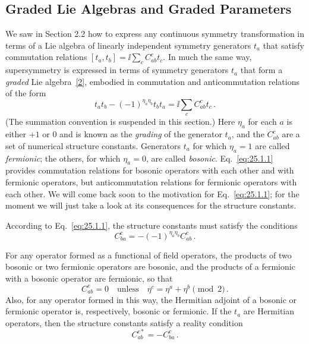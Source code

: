 
\subsection{Graded Lie Algebras and Graded Parameters}

\providecommand{\gradedbracket}[2]{\mathopen{[}#1,#2\mathclose{\}}}

We saw in Section 2.2 how to express any continuous symmetry transformation in
terms of a Lie algebra of linearly independent symmetry generators $t_a$ that
satisfy commutation relations
$[t_a,t_b]=\ii\sum_c C^c_{ab}t_c$. In much the same way, supersymmetry is
expressed in terms of symmetry generators $t_a$ that form a \emph{graded} Lie
algebra~\hyperref[ch25-ref-2]{[2]}, embodied in commutation and
anticommutation relations of the form
\begin{equation}
  t_at_b-(-1)^{\eta_a\eta_b}t_bt_a
  =\ii\sum_c C^c_{ab}t_c\,.
  \tag{25.1.1}\label{eq:25.1.1}
\end{equation}
(The summation convention is suspended in this section.) Here $\eta_a$ for
each $a$ is either $+1$ or 0 and is known as the \emph{grading} of the
generator $t_a$, and the $C^c_{ab}$ are a set of numerical structure
constants. Generators $t_a$ for which $\eta_a=1$ are called \emph{fermionic};
the others, for which $\eta_a=0$, are called \emph{bosonic}.
Eq.~\eqref{eq:25.1.1} provides commutation relations for bosonic operators with
each other and with fermionic operators, but anticommutation relations for
fermionic operators with each other. We will come back soon to the motivation
for Eq.~\eqref{eq:25.1.1}; for the moment we will just take a look at its
consequences for the structure constants.

According to Eq.~\eqref{eq:25.1.1}, the structure constants must satisfy the
conditions
\begin{equation}
  C^c_{ba}=-(-1)^{\eta_a\eta_b}C^c_{ab}\,.
  \tag{25.1.2}\label{eq:25.1.2}
\end{equation}

For any operator formed as a functional of field operators, the products of
two bosonic or two fermionic operators are bosonic, and the products of a
fermionic with a bosonic operator are fermionic, so that
\begin{equation}
  C^c_{ab}=0\quad\text{unless}\quad
  \eta^c=\eta^a+\eta^b\pmod 2\,.
  \tag{25.1.3}\label{eq:25.1.3}
\end{equation}
Also, for any operator formed in this way, the Hermitian adjoint of a bosonic
or fermionic operator is, respectively, bosonic or fermionic. If the $t_a$ are
Hermitian operators, then the structure constants satisfy a reality condition
\begin{equation}
  C^{c*}_{ab}=-C^c_{ba}\,.
  \tag{25.1.4}\label{eq:25.1.4}
\end{equation}

